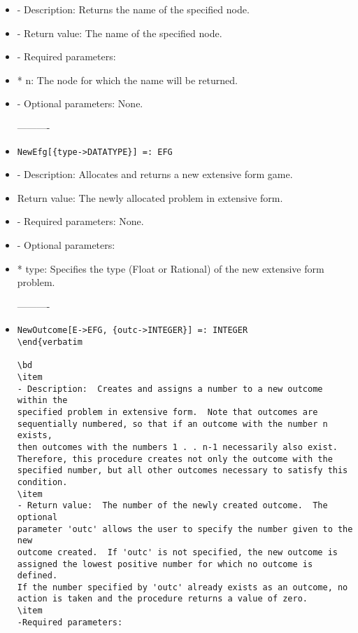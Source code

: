 \begin{itemize}
\bd
\item
- Description:  Returns the name of the specified node.
\item
- Return value:  The name of the specified node.
\item- Required parameters:

\bd
\item
*  n:  The node for which the name will be returned.
\ed

\item
- Optional parameters:  None.
\ed

----------

\item
\begin{verbatim}
NewEfg[{type->DATATYPE}] =: EFG
\end{verbatim}

\bd
\item
- Description:  Allocates and returns a new extensive form game.
\item
 Return value:  The newly allocated problem in extensive form.
\item
- Required parameters:  None.
\item
- Optional parameters: 

\bd
\item
*  type:  Specifies the type (Float or Rational) of the new extensive
form problem.
\ed
\ed

----------
\item
\begin{verbatim}
NewOutcome[E->EFG, {outc->INTEGER}] =: INTEGER
\end{verbatim

\bd
\item
- Description:  Creates and assigns a number to a new outcome within the
specified problem in extensive form.  Note that outcomes are 
sequentially numbered, so that if an outcome with the number n exists,
then outcomes with the numbers 1 . . n-1 necessarily also exist.
Therefore, this procedure creates not only the outcome with the 
specified number, but all other outcomes necessary to satisfy this 
condition.
\item
- Return value:  The number of the newly created outcome.  The optional 
parameter 'outc' allows the user to specify the number given to the new
outcome created.  If 'outc' is not specified, the new outcome is 
assigned the lowest positive number for which no outcome is defined.  
If the number specified by 'outc' already exists as an outcome, no 
action is taken and the procedure returns a value of zero.
\item
-Required parameters:


\end{verbatim}
\end{itemize}
